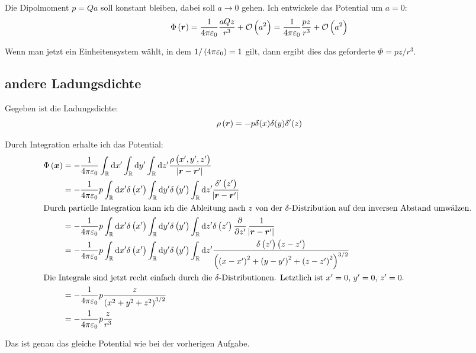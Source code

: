 \documentclass[11pt, ngerman, fleqn]{article}
\renewcommand{\vec}[1]{\boldsymbol{#1}}
\begin{document}
Die Dipolmoment $p = Qa$ soll konstant bleiben, dabei soll $a \to 0$ gehen.
Ich entwickele das Potential um $a = 0$:
\[
	\Phi\del{\vec r} = \frac{1}{4 \pi \varepsilon_0} \frac{a Q z}{r^3} + \mathcal O\del{a^2}
	= \frac{1}{4 \pi \varepsilon_0} \frac{pz}{r^3} + \mathcal O\del{a^2}
\]

Wenn man jetzt ein Einheitensystem wählt, in dem $1/\del{4 \pi \varepsilon_0} = 1$
gilt, dann ergibt dies das geforderte $\Phi = pz/r^3$.

\subsection{andere Ladungsdichte}

Gegeben ist die Ladungsdichte:
\[
	\rho\del{\vec r} = - p \delta(x) \delta(y) \delta'(z)
\]

Durch Integration erhalte ich das Potential:
\begin{align*}
	\Phi\del{\vec x}
	&= - \frac{1}{4 \pi \varepsilon_0} \int_{\mathbb R} \dif x' \int_{\mathbb R} \dif y' \int_{\mathbb R} \dif z'  \frac{\rho\del{x', y', z'}}{\abs{\vec r - \vec r'}} \\
	&= - \frac{1}{4 \pi \varepsilon_0} p \int_{\mathbb R} \dif x' \delta\del{x'} \int_{\mathbb R} \dif y' \delta\del{y'} \int_{\mathbb R} \dif z' \frac{\delta'\del{z'}}{\abs{\vec r - \vec r'}} \\
	\intertext{%
		Durch partielle Integration kann ich die Ableitung nach $z$ von der
		$\delta$-Distribution auf den inversen Abstand umwälzen.
	}
	&= - \frac{1}{4 \pi \varepsilon_0} p \int_{\mathbb R} \dif x' \delta\del{x'} \int_{\mathbb R} \dif y' \delta\del{y'} \int_{\mathbb R} \dif z' \delta\del{z'} \dpd{}{z'} \frac{1}{\abs{\vec r - \vec r'}} \\
	&= - \frac{1}{4 \pi \varepsilon_0} p \int_{\mathbb R} \dif x' \delta\del{x'} \int_{\mathbb R} \dif y' \delta\del{y'} \int_{\mathbb R} \dif z' \frac{\delta\del{z'} \del{z - z'}}{\del{\del{x-x'}^2 + \del{y-y'}^2 + \del{z-z'}^2}^{3/2}} \\
	\intertext{%
		Die Integrale sind jetzt recht einfach durch die
		$\delta$-Distributionen. Letztlich ist $x' = 0$, $y' = 0$, $z' = 0$.
	}
	&= - \frac{1}{4 \pi \varepsilon_0} p \frac{z}{\del{x^2 + y^2 + z^2}^{3/2}} \\
	&= - \frac{1}{4 \pi \varepsilon_0} p \frac{z}{r^3}
\end{align*}

Das ist genau das gleiche Potential wie bei der vorherigen Aufgabe.
\end{document}
